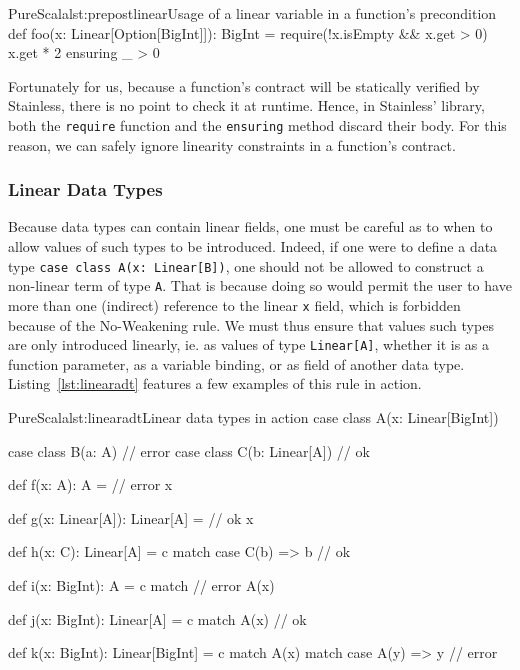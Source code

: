 \documentclass[a4paper,twoside]{article}
\newcommand{\RefCode}[1]{Listing~\ref{#1}}
\newcommand{\stt}[1]{\texttt{\small{#1}}}
\begin{document}
\begin{enumerate}
\begin{Code}{PureScala}{lst:prepostlinear}{Usage of a linear variable in a function's precondition}
def foo(x: Linear[Option[BigInt]]): BigInt = {
  require(!x.isEmpty && x.get > 0)
  x.get * 2
} ensuring { _ > 0 }
\end{Code}

Fortunately for us, because a function's contract will be statically verified by Stainless, there is no point to check it at runtime. Hence, in Stainless' library, both the \stt{require} function and the \stt{ensuring} method discard their body. For this reason, we can safely ignore linearity constraints in a function's contract.\\

\subsubsection*{Linear Data Types}

Because data types can contain linear fields, one must be careful as to when to allow values of such types to be introduced. Indeed, if one were to define a data type \stt{case class A(x:\,Linear[B])}, one should not be allowed to construct a non-linear term of type \stt{A}. That is because doing so would permit the user to have more than one (indirect) reference to the linear \stt{x} field, which is forbidden because of the No-Weakening rule. We must thus ensure that values such types are only introduced linearly, ie. as values of type \stt{Linear[A]}, whether it is as a function parameter, as a variable binding, or as field of another data type. \RefCode{lst:linearadt} features a few examples of this rule in action.

\begin{Code}{PureScala}{lst:linearadt}{Linear data types in action}
case class A(x: Linear[BigInt])

case class B(a: A)          // error
case class C(b: Linear[A])  // ok

def f(x: A): A = { // error
  x
}

def g(x: Linear[A]): Linear[A] = { // ok
  x
}

def h(x: C): Linear[A] = c match {
  case C(b) => b // ok
}

def i(x: BigInt): A = c match { // error
  A(x)
}

def j(x: BigInt): Linear[A] = c match {
  A(x) // ok
}

def k(x: BigInt): Linear[BigInt] = c match {
  A(x) match {
    case A(y) => y // error
  }
}
\end{Code}


\end{enumerate}
\end{document}
